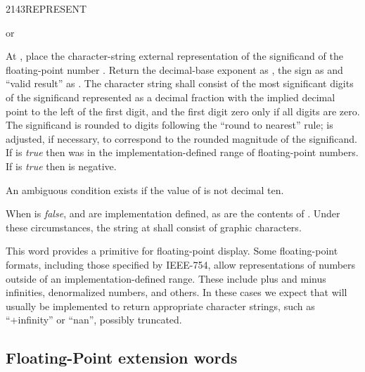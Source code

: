 \begin{worddef}{2143}{REPRESENT}
\item {}  or

	At , place the character-string external
	representation of the significand of the floating-point number
	. Return the decimal-base exponent as , the sign as
	 and ``valid result'' as .
	The character string shall consist of the  most significant
	digits of the significand represented as a decimal fraction with
	the implied decimal point to the left of the first digit, and
	the first digit zero only if all digits are zero. The significand
	is rounded to  digits following the ``round to nearest'' rule;
	 is adjusted, if necessary, to correspond to the rounded
	magnitude of the significand. If  is \emph{true}
	then  was in the implementation-defined range of floating-point
	numbers. If  is \emph{true} then  is negative.

	An ambiguous condition exists if the value of 
	is not decimal ten.

	When  is \emph{false},  and 
	are implementation defined, as are the contents of .
	Under these circumstances, the string at  shall
	consist of graphic characters.


	\begin{rationale} %
		This word provides a primitive for floating-point display.
		Some floating-point formats, including those specified by
		IEEE-754, allow representations of numbers outside of an
		implementation-defined range. These include plus and minus
		infinities, denormalized numbers, and others. In these cases
		we expect that  will usually be implemented
		to return appropriate character strings, such as ``+infinity''
		or ``nan'', possibly truncated.
	\end{rationale}
\end{worddef}


\subsection{Floating-Point extension words} %
\extended\vspace{1ex}

